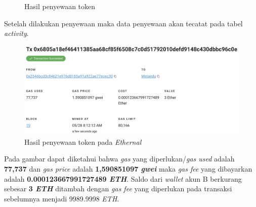 \begin{itemize}
\begin{figure} [H]
          \caption{Hasil penyewaan token}
          \label{fig:TestRentResultRental}
        \end{figure}
        Setelah dilakukan penyewaan maka data penyewaan akan tecatat pada tabel \emph{activity}.
        \begin{figure} [H] \centering
          \includegraphics[scale=0.4]{gambar/img-test-rent-rent-4.png}
          \caption{Hasil penyewaan token pada \emph{Ethernal}}
          \label{fig:TestRentResultRental2}
        \end{figure}
        Pada gambar dapat diketahui bahwa \emph{gas} yang diperlukan/\emph{gas used} adalah \textbf{77,737} dan \emph{gas price} adalah \textbf{1,590851097 \emph{gwei}} maka \emph{gas fee} yang dibayarkan adalah \textbf{0.000123667991727489 \emph{ETH}}.
      Saldo dari \emph{wallet} akun B berkurang sebesar \textbf{3 \emph{ETH}} ditambah dengan \emph{gas fee} yang diperlukan pada transaksi sebelumnya menjadi 9989.9998 \emph{ETH}.
      \begin{figure} [H] \centering

\end{figure}
\end{itemize}
